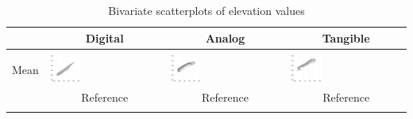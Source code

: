 \documentclass[Afour,sageh,times]{sagej}
\newcommand{\ra}[1]{\renewcommand{\arraystretch}{#1}}
\begin{document}
\begin{table}[h]
\small\sf\centering
\caption{Bivariate scatterplots of elevation values}
\ra{1.3}
\begin{tabular}{m{} m{} m{} m{}}
\toprule
& \multicolumn{1}{c}{Digital} & \multicolumn{1}{c}{Analog}  & \multicolumn{1}{c}{Tangible}\\
\midrule \\
Mean & 
\includegraphics[width=0.28\textwidth]{images/bivariate_scatterplots/dem_1.png} &
\includegraphics[width=0.28\textwidth]{images/bivariate_scatterplots/dem_2.png} &
\includegraphics[width=0.28\textwidth]{images/bivariate_scatterplots/dem_3.png}\\
& \multicolumn{1}{c}{Reference} & \multicolumn{1}{c}{Reference} & \multicolumn{1}{c}{Reference} \\
\\
\bottomrule
\end{tabular}
\label{table:scatterplots} 
\end{table}

\end{document}
